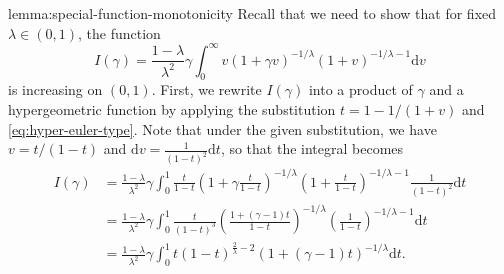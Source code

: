 \documentclass[11pt]{article}
\newcommand{\dd}{\mathrm{d}}
\begin{document}
\begin{cleverproof}{lemma:special-function-monotonicity}
    Recall that we need to show that for fixed $\lambda\in(0,1)$, the function 
    $$
    I(\gamma) = \frac{1-\lambda}{\lambda^2}\gamma\int_0^\infty v(1+\gamma v)^{-1/\lambda}(1+v)^{-1/\lambda-1}\dd v
    $$ is increasing on $(0,1)$.
 First, we rewrite $I(\gamma)$ into a product of $\gamma$ and a hypergeometric function by applying the substitution $t=1-1/(1+v)$ and \eqref{eq:hyper-euler-type}. Note that under the given substitution, we have $v=t/(1-t)$ and $\dd v=\frac{1}{(1-t)^2}\dd t$, so that the integral  becomes
    \begin{align*}
        I(\gamma)
        &=\frac{1-\lambda}{\lambda^2}\gamma\int_0^1 \frac{t}{1-t}\left(1+\gamma \frac{t}{1-t}\right)^{-1/\lambda}\left(1+\frac{t}{1-t}\right)^{-1/\lambda-1}\frac{1}{(1-t)^2}\dd t\\
        &=\frac{1-\lambda}{\lambda^2}\gamma\int_0^1 \frac{t}{(1-t)^3}\left( \frac{1+(\gamma-1)t}{1-t}\right)^{-1/\lambda}\left(\frac{1}{1-t}\right)^{-1/\lambda-1}\dd t\\
        &=\frac{1-\lambda}{\lambda^2}\gamma\int_0^1 t(1-t)^{\frac{2}{\lambda}-2}(1+(\gamma-1)t)^{-1/\lambda} \dd t.
    \end{align*}


\end{cleverproof}
\end{document}
